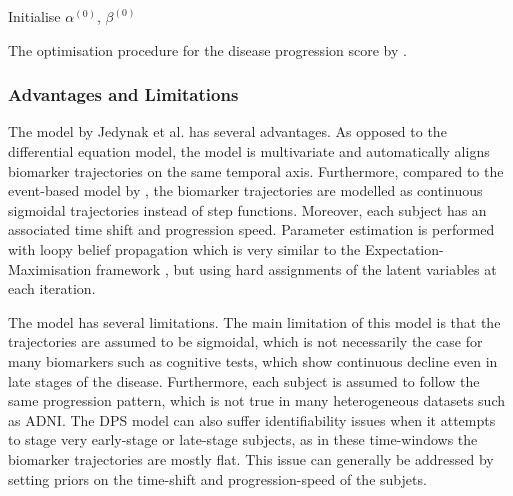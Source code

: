 \begin{algorithm}
 Initialise $\alpha^{(0)}$, $\beta^{(0)}$\;\label{alg:init}

  
 \caption{The optimisation procedure for the disease progression score by \cite{jedynak2012computational}.}
 \label{fig:algo_dps}
\end{algorithm}


\subsubsection{Advantages and Limitations}

The model by Jedynak et al. \cite{jedynak2012computational} has several advantages. As opposed to the differential equation model, the model is multivariate and automatically aligns biomarker trajectories on the same temporal axis. Furthermore, compared to the event-based model by \cite{fonteijn2012event}, the biomarker trajectories are modelled as continuous sigmoidal trajectories instead of step functions. Moreover, each subject has an associated time shift and progression speed. Parameter estimation is performed with loopy belief propagation which is very similar to the Expectation-Maximisation framework \cite{bishop2007pattern}, but using hard assignments of the latent variables at each iteration.

The model has several limitations. The main limitation of this model is that the trajectories are assumed to be sigmoidal, which is not necessarily the case for many biomarkers such as cognitive tests, which show continuous decline even in late stages of the disease. Furthermore, each subject is assumed to follow the same progression pattern, which is not true in many heterogeneous datasets such as ADNI. The DPS model can also suffer identifiability issues when it attempts to stage very early-stage or late-stage subjects, as in these time-windows the biomarker trajectories are mostly flat. This issue can generally be addressed by setting priors on the time-shift and progression-speed of the subjets.

